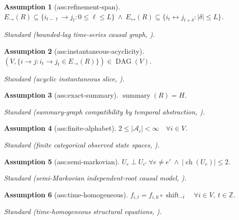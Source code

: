 \documentclass{article}
\newtheorem{assumption}{Assumption}
\begin{document}
\begin{assumption}[ass:refinement-span]\label{ass:refinement-span}
\(E_{\to}(R)\subseteq\{i_{t-\ell}\to j_t:0\le\ell\le L\}\ \wedge\ E_{\leftrightarrow}(R)\subseteq\{i_t\leftrightarrow j_{t+\delta}:|\delta|\le L\}\).
\par\smallskip\noindent\emph{Standard} (bounded-lag time-series causal graph, \cite{JahnKarnikSchulman2025}).
\end{assumption}

\begin{assumption}[ass:instantaneous-acyclicity]\label{ass:instantaneous-acyclicity}
\((V,\{i\to j:i_t\to j_t\in E_{\to}(R)\})\in\operatorname{DAG}(V)\).
\par\smallskip\noindent\emph{Standard} (acyclic instantaneous slice, \cite{Assaad2025MicroSCGFrontDoor}).
\end{assumption}

\begin{assumption}[ass:exact-summary]\label{ass:exact-summary}
\(\operatorname{summary}(R)=H\).
\par\smallskip\noindent\emph{Standard} (summary-graph compatibility by temporal abstraction, \cite{Assaad2025MicroSCGFrontDoor}).
\end{assumption}

\begin{assumption}[ass:finite-alphabet]\label{ass:finite-alphabet}
\(2\le|\mathcal A_i|<\infty\quad\forall i\in V\).
\par\smallskip\noindent\emph{Standard} (finite categorical observed state spaces, \cite{ShpitserPearl2008}).
\end{assumption}

\begin{assumption}[ass:semi-markovian]\label{ass:semi-markovian}
\(U_e\perp U_{e'}\ \forall e\ne e'\ \wedge\ |\operatorname{ch}(U_e)|\le2\).
\par\smallskip\noindent\emph{Standard} (semi-Markovian independent-root causal model, \cite{ShpitserPearl2008}).
\end{assumption}

\begin{assumption}[ass:time-homogeneous]\label{ass:time-homogeneous}
\(f_{i,t}=f_{i,0}\circ\operatorname{shift}_{-t}\quad\forall i\in V,\ t\in\mathbb Z\).
\par\smallskip\noindent\emph{Standard} (time-homogeneous structural equations, \cite{Assaad2025MicroSCGFrontDoor}).
\end{assumption}
\end{document}
